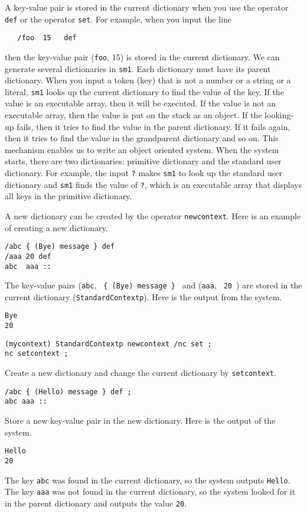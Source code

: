 \documentclass{article}
\begin{document}
A key-value pair is stored in the current dictionary
when you use the operator {\tt def}
or the operator {\tt set}.
For example,
when you input the line
\begin{verbatim}
   /foo  15   def
\end{verbatim}
then the key-value pair
({\tt foo}, 15) is stored in the current dictionary.
We can generate several dictionaries in {\tt sm1}.
Each dictionary must have its parent dictionary.
When you input a token (key) that is not a number or a string or a literal,
{\tt sm1} looks up the current dictionary to find the value of the key.
If the value is an executable array, then it will be executed.
If the value is not an executable array, then the value is put on the stack
as an object.
If the looking-up fails, 
then it tries to find the value in the parent dictionary.
If it fails again, then it tries to find the value in the grandparent
dictionary and so on.
This mechanism enables us to write an object oriented system.
When the system starts, there are two dictionaries:
primitive dictionary and the standard user dictionary.
For example, the input {\tt ?} makes {\tt sm1} to look up
the standard user dictionary and {\tt sm1} finds the value of {\tt ?},
which is an executable array that displays all keys in the primitive
dictionary.

A new dictionary can be created by the operator {\tt newcontext}.
Here is an example of creating a new dictionary.
\begin{verbatim}
/abc { (Bye) message } def 
/aaa 20 def 
abc  aaa ::
\end{verbatim}
The key-value pairs ({\tt abc}, \verb+ { (Bye) message } +
and
({\tt aaa}, \verb+ 20 +)
are stored in the current dictionary ({\tt StandardContextp}).
Here is the output from the system.
{\footnotesize \begin{verbatim}
Bye
20
\end{verbatim} }
\begin{verbatim}
(mycontext) StandardContextp newcontext /nc set ;
nc setcontext ;
\end{verbatim}
Create a new dictionary and change the current dictionary
by {\tt setcontext}.
\begin{verbatim}
/abc { (Hello) message } def ;
abc aaa ::
\end{verbatim}
Store a new key-value pair in the new dictionary.
Here is the output of the system.
{\footnotesize \begin{verbatim}
Hello
20
\end{verbatim} }
The key {\tt abc} was found in the current dictionary, so
the system outputs {\tt Hello}.
The key {\tt aaa} was not found in the current dictionary,
so the system looked for it in the parent dictionary and
outputs the value {\tt 20}.
\end{document}

